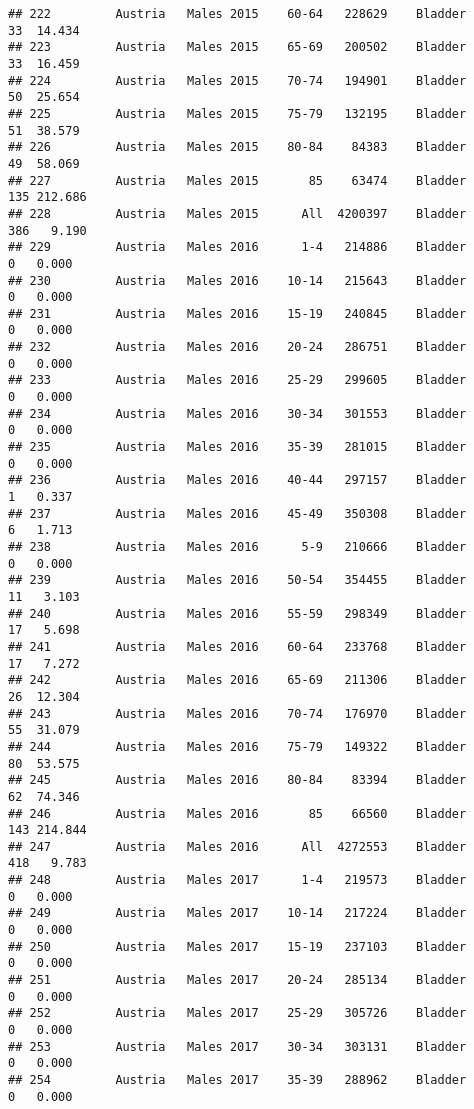 \documentclass[
]{article}
\begin{document}
\begin{verbatim}
## 222         Austria   Males 2015    60-64   228629    Bladder     33  14.434
## 223         Austria   Males 2015    65-69   200502    Bladder     33  16.459
## 224         Austria   Males 2015    70-74   194901    Bladder     50  25.654
## 225         Austria   Males 2015    75-79   132195    Bladder     51  38.579
## 226         Austria   Males 2015    80-84    84383    Bladder     49  58.069
## 227         Austria   Males 2015       85    63474    Bladder    135 212.686
## 228         Austria   Males 2015      All  4200397    Bladder    386   9.190
## 229         Austria   Males 2016      1-4   214886    Bladder      0   0.000
## 230         Austria   Males 2016    10-14   215643    Bladder      0   0.000
## 231         Austria   Males 2016    15-19   240845    Bladder      0   0.000
## 232         Austria   Males 2016    20-24   286751    Bladder      0   0.000
## 233         Austria   Males 2016    25-29   299605    Bladder      0   0.000
## 234         Austria   Males 2016    30-34   301553    Bladder      0   0.000
## 235         Austria   Males 2016    35-39   281015    Bladder      0   0.000
## 236         Austria   Males 2016    40-44   297157    Bladder      1   0.337
## 237         Austria   Males 2016    45-49   350308    Bladder      6   1.713
## 238         Austria   Males 2016      5-9   210666    Bladder      0   0.000
## 239         Austria   Males 2016    50-54   354455    Bladder     11   3.103
## 240         Austria   Males 2016    55-59   298349    Bladder     17   5.698
## 241         Austria   Males 2016    60-64   233768    Bladder     17   7.272
## 242         Austria   Males 2016    65-69   211306    Bladder     26  12.304
## 243         Austria   Males 2016    70-74   176970    Bladder     55  31.079
## 244         Austria   Males 2016    75-79   149322    Bladder     80  53.575
## 245         Austria   Males 2016    80-84    83394    Bladder     62  74.346
## 246         Austria   Males 2016       85    66560    Bladder    143 214.844
## 247         Austria   Males 2016      All  4272553    Bladder    418   9.783
## 248         Austria   Males 2017      1-4   219573    Bladder      0   0.000
## 249         Austria   Males 2017    10-14   217224    Bladder      0   0.000
## 250         Austria   Males 2017    15-19   237103    Bladder      0   0.000
## 251         Austria   Males 2017    20-24   285134    Bladder      0   0.000
## 252         Austria   Males 2017    25-29   305726    Bladder      0   0.000
## 253         Austria   Males 2017    30-34   303131    Bladder      0   0.000
## 254         Austria   Males 2017    35-39   288962    Bladder      0   0.000

\end{verbatim}
\end{document}
